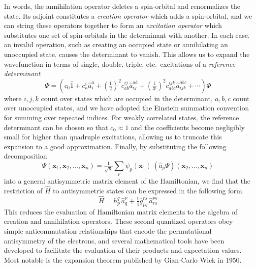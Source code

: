 In words, the annihilation operator deletes a spin-orbital and renormalizes the
state.
Its adjoint constitutes a {\itshape creation operator} which adds a
spin-orbital, and we can string these operators together to form an {\itshape
excitation operator} which substitutes one set of spin-orbitals in the
determinant with another.
In each case, an invalid operation, such as creating an occupied state or
annihilating an unoccupied state, causes the determinant to vanish.
This allows us to expand the wavefunction in terms of single, double, triple,
etc.\ excitations of a {\itshape reference determinant}
\begin{equation}
    \label{eq:intro-ci-expansion}
    \Psi
    =
    \left(
        c_0
        \hat{1}
        +
        c_a^i
        \hat{a}^a_i
        +
        (\tfrac{1}{2})^2
        c_{ab}^{ij}
        \hat{a}^{ab}_{ij}
        +
        (\tfrac{1}{3!})^2
        c_{abc}^{ijk}
        \hat{a}^{abc}_{ijk}
        +
        \cdots
    \right)
    \Phi
\end{equation}
where \(i, j, k\) count over states which are occupied in the determinant, \(a,
b, c\) count over unoccupied states, and we have adopted the Einstein summation
convention for summing over repeated indices.
For weakly correlated states, the reference determinant can be chosen so that
\(c_0 \approx 1\) and the coefficients become negligibly small for higher than
quadruple excitations, allowing us to truncate this expansion to a good
approximation.
Finally, by substituting the following decomposition
\begin{equation}
    \Psi(\mathbf{x}_1, \mathbf{x}_2, \ldots, \mathbf{x}_n)
    =
    \tfrac{1}{\sqrt{n}}
    \sum_p
    \psi_p(\mathbf{x}_1)\,
    (\hat{a}_p\Psi)(\mathbf{x}_2, \ldots, \mathbf{x}_n)
\end{equation}
into a general antisymmetric matrix element of the Hamiltonian, we find that the
restriction of \(\hat{H}\) to antisymmetric states can be expressed in the
following form.
\begin{equation}
    \label{eq:introduction:second-quantized-hamiltonian}
    \hat{H}
    =
    h_p^q\,
    \hat{a}^p_q
    +
    \tfrac{1}{4}
    \overline{g}_{pq}^{rs}\,
    \hat{a}^{pq}_{rs}
\end{equation}
This reduces the evaluation of Hamiltonian matrix elements to the algebra of
creation and annihilation operators.
These second quantized operators obey simple anticommutation relationships that
encode the permutational antisymmetry of the electrons, and several mathematical
tools have been developed to facilitate the evaluation of their products and
expectation values.
Most notable is the expansion theorem published by Gian-Carlo Wick in
1950.\cite{Wick:1950p268}



